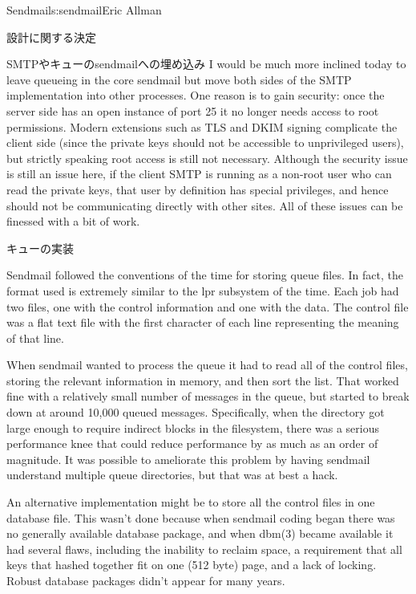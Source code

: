 \begin{aosachapter}{Sendmail}{s:sendmail}{Eric Allman}
\begin{aosasect1}{設計に関する決定}
\begin{aosasect2}{SMTPやキューのsendmailへの埋め込み}
I would be much more inclined today to leave queueing in the core
sendmail but move both sides of the SMTP implementation into other
processes. One reason is to gain security: once the server side has an
open instance of port 25 it no longer needs access to root
permissions. Modern extensions such as TLS and DKIM signing complicate
the client side (since the private keys should not be accessible to
unprivileged users), but strictly speaking root access is still not
necessary. Although the security issue is still an issue here, if the
client SMTP is running as a non-root user who can read the private
keys, that user by definition has special privileges, and hence should
not be communicating directly with other sites. All of these issues
can be finessed with a bit of work.

\end{aosasect2}

\begin{aosasect2}{キューの実装}

Sendmail followed the conventions of the time for storing queue files.
In fact, the format used is extremely similar to the lpr subsystem of
the time.  Each job had two files, one with the control information
and one with the data. The control file was a flat text file with the
first character of each line representing the meaning of that line.

When sendmail wanted to process the queue it had to read all of the
control files, storing the relevant information in memory, and then
sort the list. That worked fine with a relatively small number of
messages in the queue, but started to break down at around 10,000
queued messages. Specifically, when the directory got large enough to
require indirect blocks in the filesystem, there was a serious
performance knee that could reduce performance by as much as an order
of magnitude. It was possible to ameliorate this problem by having
sendmail understand multiple queue directories, but that was at best a
hack.

An alternative implementation might be to store all the control files
in one database file. This wasn't done because when sendmail coding
began there was no generally available database package, and when
dbm(3) became available it had several flaws, including the inability
to reclaim space, a requirement that all keys that hashed together fit
on one (512 byte) page, and a lack of locking. Robust database
packages didn't appear for many years.


\end{aosasect2}
\end{aosasect1}
\end{aosachapter}
